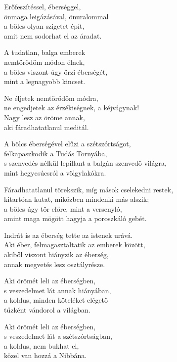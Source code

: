 \begin{dhpverse}

 Erőfeszítéssel, éberséggel,\\
önmaga leigázásával, önuralommal\\
a bölcs olyan szigetet épít,\\
amit nem sodorhat el az áradat.

 A tudatlan, balga emberek\\
nemtörődöm módon élnek,\\
a bölcs viszont úgy őrzi éberségét,\\
mint a legnagyobb kincset.

 Ne éljetek nemtörődöm módra,\\
ne engedjetek az érzékiségnek, a kéjvágynak!\\
Nagy lesz az öröme annak,\\
aki fáradhatatlanul meditál.

 A bölcs éberségével elűzi a szétszórtságot,\\
felkapaszkodik a Tudás Tornyába,\\
s szenvedés nélkül lepillant a balgán szenvedő világra,\\
mint hegycsúcsról a völgylakókra.

 Fáradhatatlanul törekszik, míg mások cselekedni restek,\\
kitartóan kutat, miközben mindenki más alszik;\\
a bölcs úgy tör előre, mint a versenyló,\\
amint maga mögött hagyja a poroszkáló gebét.

 Indrát is az éberség tette az istenek urává.\\
Aki éber, felmagasztaltatik az emberek között,\\
akiből viszont hiányzik az éberség,\\
annak megvetés lesz osztályrésze.

\end{dhpverse}
\newpage
\begin{dhpverse}

 Aki örömét leli az éberségben,\\
s veszedelmet lát annak hiányában,\\
a koldus, minden köteléket elégető\\
tűzként vándorol a világban.

 Aki örömét leli az éberségben,\\
s veszedelmet lát a szétszórtságban,\\
a koldus, nem bukhat el,\\
közel van hozzá a Nibbána.

\end{dhpverse}
